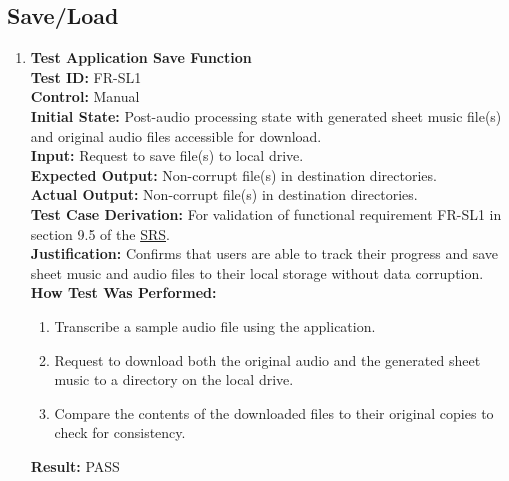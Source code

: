 \documentclass[12pt, titlepage]{article}
\begin{document}
  \subsection{Save/Load}
  \begin{enumerate}
    \item \textbf{Test Application Save Function} \\
      \newline
      \textbf{Test ID:} FR-SL1 \\
      \textbf{Control:} Manual \\
      \textbf{Initial State:} Post-audio processing state with generated sheet music file(s) and original audio files accessible 
      for download. \\
      \textbf{Input:} Request to save file(s) to local drive. \\
      \textbf{Expected Output:} Non-corrupt file(s) in destination directories. \\
      \textbf{Actual Output:} Non-corrupt file(s) in destination directories. \\
      \textbf{Test Case Derivation:} For validation of functional requirement FR-SL1 in section 9.5 of the 
      \href{https://github.com/emilyperica/ScoreGen/blob/main/docs/SRS-Volere/SRS.pdf}{SRS}. \\
      \textbf{Justification:} Confirms that users are able to track their progress and save sheet music and audio files to their local 
      storage without data corruption.\\
      \textbf{How Test Was Performed:}
      \begin{enumerate}
          \item Transcribe a sample audio file using the application.
          \item Request to download both the original audio and the generated sheet music to a directory on the local drive.
          \item Compare the contents of the downloaded files to their original copies to check for consistency.
      \end{enumerate}
      \textbf{Result:} PASS
    

\end{enumerate}
\end{document}
